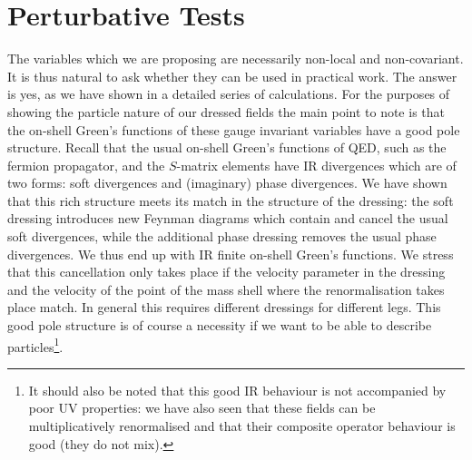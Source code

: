 \documentclass[12pt,a4paper]{article}
\begin{document}
\section*{Perturbative Tests}
The variables which we are proposing are necessarily non-local and non-covariant. It is thus
natural to ask whether
they can be used in practical work. The answer is yes, as we have shown
in a detailed series of calculations\cite{Bagan:1998kg,Bagan:1999jk}.
For the purposes of showing the particle nature of our dressed
fields the main point to note is that the on-shell Green's functions of these gauge invariant variables have a
good pole structure. Recall that the usual on-shell Green's functions of QED, such as the fermion propagator,
and the $S$-matrix elements have IR divergences which are of two forms: soft divergences and (imaginary) phase
divergences. We have shown that this rich structure meets its match in the structure of the dressing: the soft
dressing introduces new Feynman diagrams which contain and cancel the usual soft divergences, while the additional
phase dressing removes the usual phase divergences. We thus end up with IR finite on-shell Green's functions. We stress
that this cancellation only takes place if the velocity parameter in the dressing and the velocity of the point of the
mass shell where the renormalisation takes place match. In general this requires different dressings for
different legs.
This good pole structure is of course a necessity if we want to be able to describe
particles\footnote{It should also be noted that this
good IR behaviour is not accompanied by poor UV properties: we have also seen that these fields can be
multiplicatively
renormalised and that their composite operator behaviour is good (they do not mix\cite{Bagan:1999jk}).}.
\end{document}
